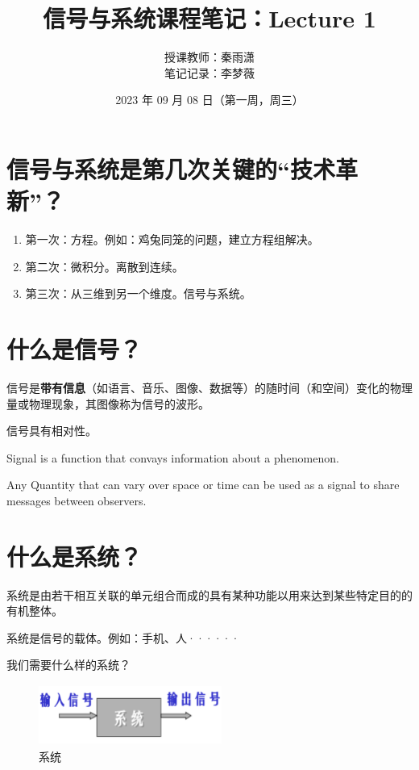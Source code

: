 \documentclass{ctexart}
\begin{document}
\title{信号与系统课程笔记：Lecture 1}
\author{授课教师：秦雨潇 \\
        笔记记录：李梦薇}
\date{2023 年 09 月 08 日（第一周，周三）}
\maketitle

\section{信号与系统是第几次关键的“技术革新”？}
\begin{enumerate}[itemindent=2em,label=(\arabic*)]
    \item 第一次：方程。例如：鸡兔同笼的问题，建立方程组解决。
    \item 第二次：微积分。离散到连续。
    \item 第三次：从三维到另一个维度。信号与系统。
\end{enumerate}

\section{什么是信号？}
信号是\textbf{带有信息}（如语言、音乐、图像、数据等）的随时间（和空间）变化的物理量或物理现象，其图像称为信号的波形。\par
信号具有相对性。\par
Signal is a function that convays information about a phenomenon. \par
Any Quantity that can vary over space or time can be used as a signal to share messages between observers.

\section{什么是系统？}
系统是由若干相互关联的单元组合而成的具有某种功能以用来达到某些特定目的的有机整体。\par
系统是信号的载体。例如：手机、人······\par
我们需要什么样的系统？\par
\begin{figure}[htbp]
    \centering
    \includegraphics[width=6cm,height=2cm]{系统.png}
    \caption{系统}
\end{figure}
\end{document}
